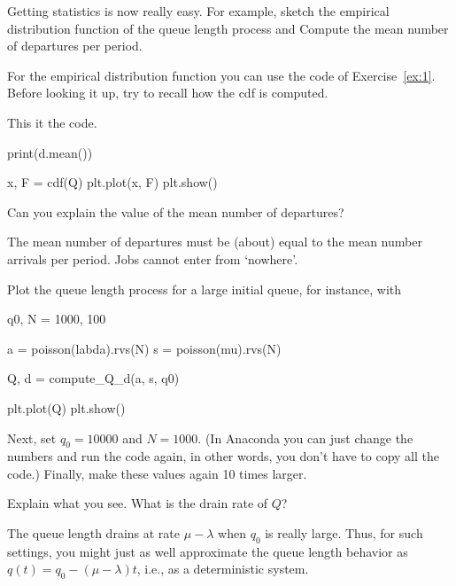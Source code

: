 \documentclass{scrartcl}
\begin{document}
\begin{exercise}
  Getting statistics is now really easy. For example,  sketch the empirical distribution function of the queue length process and Compute the mean number of departures per period.
  \hintsymbol\begin{hint}
For  the empirical distribution function  you can use the code of Exercise~\ref{ex:1}. Before looking it up, try to recall how the cdf is computed.
  \end{hint}


  \begin{solution}
This it the code.    
  \begin{pyverbatim}
print(d.mean())
    
x, F = cdf(Q)
plt.plot(x, F)
plt.show()
  \end{pyverbatim}
  \end{solution}
\end{exercise}

\begin{exercise}
  Can you explain the value of the mean number of departures?
  \begin{solution}
    The mean number of departures must  be (about) equal  to the mean number arrivals per period. Jobs cannot enter from `nowhere'.
  \end{solution}
\end{exercise}


\begin{exercise}
Plot the queue length process for a large initial queue, for instance, with

\begin{pyverbatim}
q0, N = 1000, 100

a = poisson(labda).rvs(N)
s = poisson(mu).rvs(N)

Q, d = compute_Q_d(a, s, q0)

plt.plot(Q)
plt.show()
  \end{pyverbatim}

Next, set $q_0=10000$ and $N=1000$.  (In Anaconda you can just change the numbers and run the code again, in other words, you don't have to copy all the code.) Finally,  make these values again 10 times larger. 

Explain what you see. What is the drain rate of $Q$?
\begin{solution}
  The queue length drains at rate $\mu-\lambda$ when $q_0$ is really large. Thus, for such settings, you might just as well approximate the queue length behavior as $q(t) = q_0 - (\mu-\lambda)t$, i.e., as a deterministic system.
\end{solution}
\end{exercise}
\end{document}
